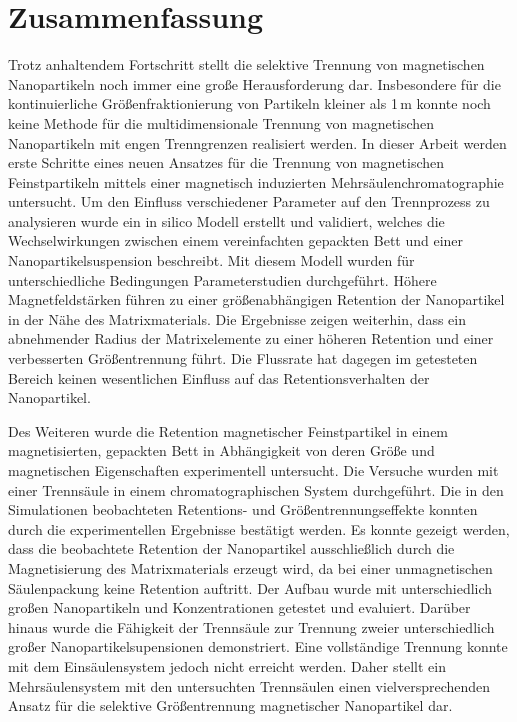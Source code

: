 \chapter{Zusammenfassung}
\label{ch:abstract_de}
Trotz anhaltendem Fortschritt stellt die selektive Trennung von magnetischen Nanopartikeln noch immer eine große Herausforderung dar. Insbesondere für die kontinuierliche Größenfraktionierung von Partikeln kleiner als 1\,\textmu m  konnte noch keine Methode für die multidimensionale Trennung von magnetischen Nanopartikeln mit engen Trenngrenzen realisiert werden. In dieser Arbeit werden erste Schritte eines neuen Ansatzes für die Trennung von magnetischen Feinstpartikeln mittels einer magnetisch induzierten Mehrsäulenchromatographie untersucht. Um den Einfluss verschiedener Parameter auf den Trennprozess zu analysieren wurde ein in silico Modell erstellt und validiert, welches die Wechselwirkungen zwischen einem vereinfachten gepackten Bett und einer Nanopartikelsuspension beschreibt. Mit diesem Modell wurden für unterschiedliche Bedingungen Parameterstudien durchgeführt. Höhere Magnetfeldstärken führen zu einer größenabhängigen Retention der Nanopartikel in der Nähe des Matrixmaterials. Die Ergebnisse zeigen weiterhin, dass ein abnehmender Radius der Matrixelemente zu einer höheren Retention und einer verbesserten Größentrennung führt. Die Flussrate hat dagegen im getesteten Bereich keinen wesentlichen Einfluss auf das Retentionsverhalten der Nanopartikel.

Des Weiteren wurde die Retention magnetischer Feinstpartikel
in einem magnetisierten, gepackten Bett in Abhängigkeit von deren Größe und magnetischen Eigenschaften experimentell untersucht. Die Versuche wurden mit einer Trennsäule in einem chromatographischen System durchgeführt. Die in den Simulationen beobachteten Retentions- und Größentrennungseffekte konnten durch die experimentellen Ergebnisse bestätigt werden. Es konnte gezeigt werden, dass die beobachtete Retention der Nanopartikel ausschließlich durch die Magnetisierung des Matrixmaterials erzeugt wird, da bei einer unmagnetischen Säulenpackung keine Retention auftritt. Der Aufbau wurde mit unterschiedlich großen Nanopartikeln und Konzentrationen getestet und evaluiert. Darüber hinaus wurde die Fähigkeit der Trennsäule zur Trennung zweier unterschiedlich großer Nanopartikelsupensionen demonstriert. Eine vollständige Trennung konnte mit dem Einsäulensystem jedoch nicht erreicht werden. Daher stellt ein Mehrsäulensystem mit den untersuchten Trennsäulen einen vielversprechenden Ansatz für die selektive Größentrennung magnetischer Nanopartikel dar.  

